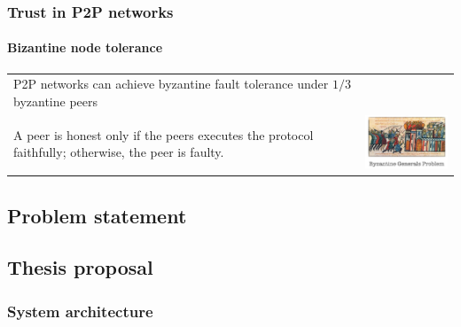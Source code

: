 \documentclass[12pt]{beamer}
\begin{document}
  
  \begin{frame}
  \frametitle{Trust in P2P networks}
  \framesubtitle{Bizantine node tolerance}
  \begin{table}
  \begin{tabular}{p{7cm}p{3cm}}
    P2P networks can achieve byzantine fault tolerance under $1/3$ byzantine
    peers\\
    A peer is honest only if the peers executes the protocol faithfully;
    otherwise, the peer is faulty.
  &
  \vspace{1.5cm}
  \includegraphics[width=4cm]{../../presentacion/img/bizantine_generals_problem}\\
  \end{tabular}
  \end{table}
  \end{frame}



  

  \subsection{Problem statement}


  \subsection{Thesis proposal}

  \subsubsection{System architecture}
\end{document}
